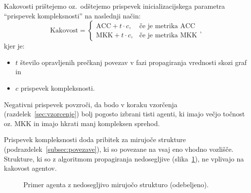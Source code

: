 \documentclass[a4paper,12pt,openright]{book}
\begin{document}
    Kakovosti prištejemo oz.\ odštejemo prispevek inicializacijskega parametra \enquote{prispevek kompleksnosti} na naslednji način:
    \begin{equation}
        \text{Kakovost}=
        \begin{cases}
            \text{ACC} + t \cdot c, & \text{če je metrika ACC} \\
            \text{MKK} + t \cdot c, & \text{če je metrika MKK}
        \end{cases},
        \label{eq:prispevek_velikosti}
    \end{equation}
    kjer je:
    \begin{itemize}
        \item $t$ število opravljenih prečkanj povezav v fazi propagiranja vrednosti skozi graf in
        \item $c$ prispevek kompleksnosti.
    \end{itemize}

    \pagebreak

    Negativni prispevek povzroči, da bodo v koraku vzorčenja (razdelek~\ref{sec:vzorcenje}) bolj pogosto izbrani tisti agenti, ki imajo večjo točnost oz.
    MKK in imajo hkrati manj kompleksen sprehod.

    Prispevek kompleksnosti doda pribitek za mirujoče strukture (podrazdelek~\ref{subsec:povezave}), ki so povezane na vsaj eno vhodno vozlišče.
    Strukture, ki so z algoritmom propagiranja nedosegljive (slika~\ref{fig:skica_agenta_nedosegljiva_globoka_struktura}), ne vplivajo na kakovost agentov.

    \begin{figure}[H]
        \centering
        \caption{Primer agenta z nedosegljivo mirujočo strukturo (odebeljeno).}
        \label{fig:skica_agenta_nedosegljiva_globoka_struktura}
    \end{figure}
\end{document}
